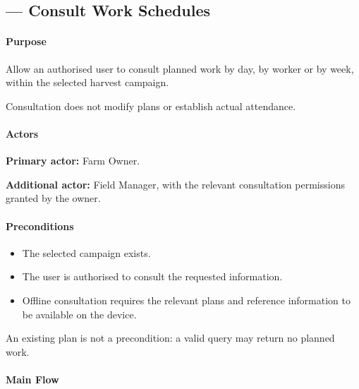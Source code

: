 \subsection{ --- Consult Work Schedules}
\label{uc:09}

\paragraph{Purpose}

Allow an authorised user to consult planned work
by day, by worker or by week,
within the selected harvest campaign.

Consultation does not modify plans
or establish actual attendance.


\paragraph{Actors}

\textbf{Primary actor:} Farm Owner.

\textbf{Additional actor:} Field Manager,
with the relevant consultation permissions granted by the owner.

\paragraph{Preconditions}

\begin{itemize}
    \item The selected campaign exists.
    \item The user is authorised to consult
    the requested information.
    \item Offline consultation requires
    the relevant plans and reference information
    to be available on the device.
\end{itemize}

An existing plan is not a precondition:
a valid query may return no planned work.

\paragraph{Main Flow}

